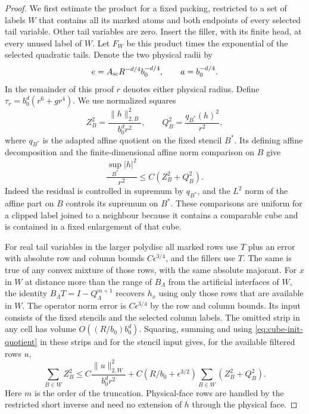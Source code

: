 \documentclass[11pt]{article}
\theoremstyle{definition}
\begin{document}
\begin{proof}
We first estimate the product for a fixed packing, restricted to
a set of labels \(W\) that contains all its marked atoms and
both endpoints of every selected tail variable. Other tail
variables are zero. Insert the filler, with its finite head, at
every unused label of \(W\). Let \(F_W\) be this product times
the exponential of the selected quadratic tails. Denote the
two physical radii by
\begin{equation}
 e=A_{\rm sc}R^{-d/4}b_0^{-d/4},\qquad
 a=b_0^{-d/4}.
\end{equation}
In the remainder of this proof \(r\) denotes either physical
radius. Define
\(\tau_r=b_0^d(r^6+gr^4)\). We use normalized squares
\begin{equation}
 Z_B^2=\frac{\|h\|_{2,B}^2}{b_0^d r^2},\qquad
 Q_B^2=\frac{q_{B^*}(h)^2}{r^2},
\end{equation}
where \(q_{B^*}\) is the adapted affine quotient on the fixed
stencil \(B^*\). Its defining affine decomposition and the
finite-dimensional affine norm comparison on \(B\) give
\begin{equation}
 \frac{\sup_{B^*}|h|^2}{r^2}\le C(Z_B^2+Q_B^2).
 \label{eq:cube-init-quotient}
\end{equation}
Indeed the residual is controlled in supremum by \(q_{B^*}\),
and the \(L^2\) norm of the affine part on \(B\) controls its
supremum on \(B^*\). These comparisons are uniform for a clipped
label joined to a neighbour because it contains a comparable
cube and is contained in a fixed enlargement of that cube.

For real tail variables in the larger polydisc all marked rows
use \(T\) plus an error with absolute row and column bounds
\(C\epsilon^{3/4}\), and the fillers use \(T\). The same is true
of any convex mixture of those rows, with the same absolute
majorant. For \(x\) in \(W\) at distance more than the range
of \(B_\Lambda\) from the artificial interfaces of \(W\), the
identity \(B_\Lambda T=I-Q_\Lambda^{m+1}\) recovers \(h_x\) using
only those rows that are available in \(W\). The operator norm
error is \(C\epsilon^{3/4}\) by the row and column bounds. Its
input consists of the fixed stencils and the selected column
labels. The omitted strip in any cell has volume
\(O((R/b_0)b_0^d)\). Squaring, summing and using
\eqref{eq:cube-init-quotient} in these strips and for the
stencil input gives, for the available filtered rows \(u\),
\begin{equation}
 \sum_{B\in W} Z_B^2
 \le C\frac{\|u\|_{2,W}^2}{b_0^d r^2}
    +C(R/b_0+\epsilon^{3/2})\sum_{B\in W}(Z_B^2+Q_B^2).
 \label{eq:cube-init-stitching}
\end{equation}
Here \(m\) is the order of the truncation. Physical-face rows
are handled by the restricted short inverse and need no
extension of \(h\) through the physical face.


\end{proof}
\end{document}
